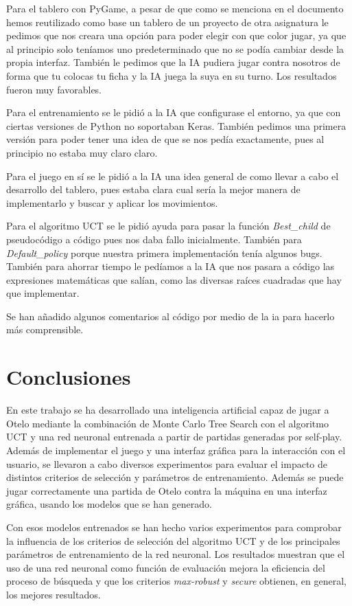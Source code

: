 \documentclass[conference,a4paper]{IEEEtran}
\begin{document}
Para el tablero con PyGame, a pesar de que como se menciona en el documento hemos reutilizado como base un tablero de un proyecto de otra asignatura le pedimos que nos creara una opción para poder elegir con que color jugar, ya que al principio solo teníamos uno predeterminado que no se podía cambiar desde la propia interfaz. También le pedimos que la IA pudiera jugar contra nosotros de forma que tu colocas tu ficha y la IA juega la suya en su turno. Los resultados fueron muy favorables.

Para el entrenamiento se le pidió a la IA que configurase el entorno, ya que con ciertas versiones de Python no soportaban Keras. También pedimos una primera versión para poder tener una idea de que se nos pedía exactamente, pues al principio no estaba muy claro claro.

Para el juego en sí se le pidió a la IA una idea general de como llevar a cabo el desarrollo del tablero, pues estaba clara cual sería la mejor manera de implementarlo y buscar y aplicar los movimientos.

Para el algoritmo UCT se le pidió ayuda para pasar la función \textit{Best\_child} de pseudocódigo a código pues nos daba fallo inicialmente. También para \textit{Default\_policy} porque nuestra primera implementación tenía algunos bugs. También para ahorrar tiempo le pedíamos a la IA que nos pasara a código las expresiones matemáticas que salían, como las diversas raíces cuadradas que hay que implementar.

Se han añadido algunos comentarios al código por medio de la ia para hacerlo más comprensible.




\section{Conclusiones}\label{sec:Conclusiones}
En este trabajo se ha desarrollado una inteligencia artificial capaz de jugar a Otelo mediante la combinación de Monte Carlo Tree Search con el algoritmo UCT y una red neuronal entrenada a partir de partidas generadas por self-play. Además de implementar el juego y una interfaz gráfica para la interacción con el usuario, se llevaron a cabo diversos experimentos para evaluar el impacto de distintos criterios de selección y parámetros de entrenamiento.
Además se puede jugar correctamente una partida de Otelo contra la máquina en una interfaz gráfica, usando los modelos que se han generado.

Con esos modelos entrenados se han hecho varios experimentos para comprobar la influencia de los criterios de selección del algoritmo UCT y de los principales parámetros de entrenamiento de la red neuronal. Los resultados muestran que el uso de una red neuronal como función de evaluación mejora la eficiencia del proceso de búsqueda y que los criterios \textit{max-robust} y \textit{secure} obtienen, en general, los mejores resultados. 
\end{document}
